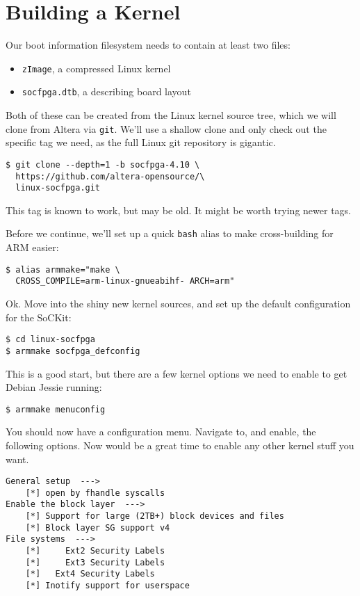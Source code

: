 \documentclass{sockitguide}
\begin{document}
\section{Building a Kernel}

Our boot information filesystem needs to contain at least two files:
\begin{itemize}
\item \texttt{zImage}, a compressed Linux kernel
\item \texttt{socfpga.dtb}, a  describing board layout
\end{itemize}

Both of these can be created from the Linux kernel source tree, which
we will clone from Altera via \texttt{git}. We'll use a shallow clone
and only check out the specific tag we need, as the full Linux git
repository is gigantic.

\begin{verbatim}
$ git clone --depth=1 -b socfpga-4.10 \
  https://github.com/altera-opensource/\
  linux-socfpga.git
\end{verbatim}

This tag is known to work, but may be old. It might be worth trying newer
tags.

Before we continue, we'll set up a quick \texttt{bash} alias to make
cross-building for ARM easier:
\begin{verbatim}
$ alias armmake="make \
  CROSS_COMPILE=arm-linux-gnueabihf- ARCH=arm"
\end{verbatim}

Ok. Move into the shiny new kernel sources, and set up the default
configuration for the SoCKit:
\begin{verbatim}
$ cd linux-socfpga
$ armmake socfpga_defconfig
\end{verbatim}

This is a good start, but there are a few kernel options we need to
enable to get Debian Jessie running:
\begin{verbatim}
$ armmake menuconfig
\end{verbatim}

You should now have a configuration menu. Navigate to, and enable, the
following options. Now would be a great time to enable any other kernel
stuff you want.

\begin{verbatim}
General setup  --->
    [*] open by fhandle syscalls
Enable the block layer  --->
    [*] Support for large (2TB+) block devices and files
    [*] Block layer SG support v4
File systems  --->
    [*]     Ext2 Security Labels
    [*]     Ext3 Security Labels
    [*]   Ext4 Security Labels
    [*] Inotify support for userspace
\end{verbatim}
\end{document}
